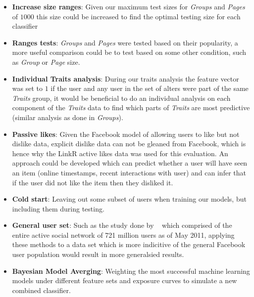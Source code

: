 \begin{itemize}
\item \textbf{Increase size ranges}: Given our maximum test sizes for \emph{Groups} and \emph{Pages} of $1000$ this size could be 
increased to find the optimal testing size for each classifier
\item \textbf{Ranges tests}: \emph{Groups} and \emph{Pages} were tested based on their popularity, a more useful comparison could be to 
test based on some other condition, such as \emph{Group} or \emph{Page} size.
\item \textbf{Individual Traits analysis}: During our traits analysis the feature vector was set to $1$ if the user and any user in 
the set of alters were part of the same \emph{Traits} group, it would be beneficial to do an individual analysis on each component of 
the \emph{Traits} data to find which parts of \emph{Traits} are most predictive (similar analysis as done in \emph{Groups}).
\item \textbf{Passive likes}: Given the Facebook model of allowing users to like but not dislike data, explicit dislike data can not be gleaned
from Facebook, which is hence why the LinkR active likes data was used for this evaluation. An approach could be developed which can predict 
whether a user will have seen an item (online timestamps, recent interactions with user) and can infer that if the user did not like the item then
they disliked it.
\item \textbf{Cold start}: Leaving out some subset of users when training our models, but including them during testing.
\item \textbf{General user set}: Such as the study done by ~\cite{jugand} which comprised of the entire active social network of 721 million users 
as of May 2011, applying these methods to a data set which is more indicitive of the general Facebook user population would result in more generalsied 
results.
\item \textbf{Bayesian Model Averging}: Weighting the most successful machine learning models under different feature sets and exposure curves 
to simulate a new combined classifier.
\end{itemize}

